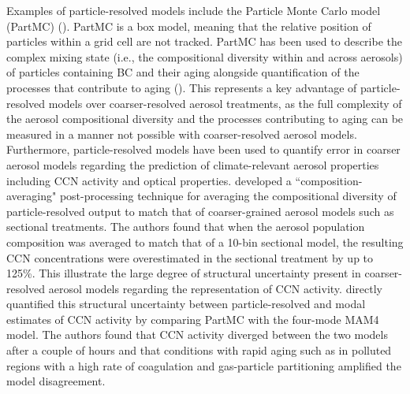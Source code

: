 Examples of particle-resolved models include the Particle Monte Carlo model (PartMC) (\cite{riemer_simulating_2009}). PartMC is a box model, meaning that the relative position of particles within a grid cell are not tracked. PartMC has been used to describe the complex mixing state (i.e., the compositional diversity within and across aerosols) of particles containing BC and their aging alongside quantification of the processes that contribute to aging (\cite{riemer_simulating_2009}). This represents a key advantage of particle-resolved models over coarser-resolved aerosol treatments, as the full complexity of the aerosol compositional diversity and the processes contributing to aging can be measured in a manner not possible with coarser-resolved aerosol models. Furthermore, particle-resolved models have been used to quantify error in coarser aerosol models regarding the prediction of climate-relevant aerosol properties including CCN activity and optical properties. \cite{zaveri_particle-resolved_2010} developed a ``composition-averaging" post-processing technique for averaging the compositional diversity of particle-resolved output to match that of coarser-grained aerosol models such as sectional treatments. The authors found that when the aerosol population composition was averaged to match that of a 10-bin sectional model, the resulting CCN concentrations were overestimated in the sectional treatment by up to 125\%. This illustrate the large degree of structural uncertainty present in coarser-resolved aerosol models regarding the representation of CCN activity. \cite{fierce_quantifying_2024} directly quantified this structural uncertainty between particle-resolved and modal estimates of CCN activity by comparing PartMC with the four-mode MAM4 model. The authors found that CCN activity diverged between the two models after a couple of hours and that conditions with rapid aging such as in polluted regions with a high rate of coagulation and gas-particle partitioning amplified the model disagreement. 

